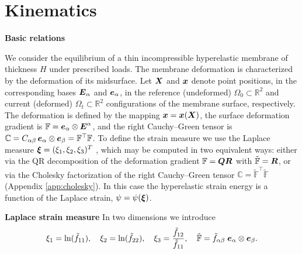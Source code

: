 \section{Kinematics}
\textbf{Basic relations}

We consider the equilibrium of a thin incompressible hyperelastic membrane of thickness $H$ under
prescribed loads.
The membrane deformation is characterized by the deformation of its midsurface.
Let \(\boldsymbol{X}\) and \(\boldsymbol{x}\) denote point positions,
in the corresponding bases \(\boldsymbol{E}_{\alpha}\) and \(\boldsymbol{e}_{\alpha}\),
in the reference (undeformed) \(\Omega_0 \subset \mathbb{R}^2\) and current (deformed) \(\Omega_t \subset \mathbb{R}^2\)
configurations of the membrane surface, respectively.
The deformation is defined by the mapping \(\boldsymbol{x} = \boldsymbol{x}(\boldsymbol{X})\),
the surface deformation gradient is \(\mathbb{F} = \boldsymbol{e}_{\alpha}\otimes\boldsymbol{E}^{\alpha}\),
and the right Cauchy–Green tensor is \(\mathbb C = C_{\alpha\beta} \,\boldsymbol{e}_{\alpha} \otimes \boldsymbol{e}_{\beta} = \mathbb F^{\top} \mathbb F\).
To define the strain measure we use the Laplace measure \(\boldsymbol{\xi} = (\xi_1 , \xi_2 , \xi_3)^T\) \cite{xi2023},
which may be computed in two equivalent ways:
either via the QR decomposition of the deformation gradient \(\mathbb F = \boldsymbol{Q} \boldsymbol{R}\) with \(\tilde{\mathbb F} = \boldsymbol{R}\),
or via the Cholesky factorization of the right Cauchy–Green tensor \(\mathbb C = \tilde{\mathbb F}^{\top}\tilde{\mathbb F}\) (Appendix \ref{app:cholesky}).
In this case the hyperelastic strain energy is a function of the Laplace strain, \(\psi = \psi(\boldsymbol{\xi})\).


\textbf{Laplace strain measure}
In two dimensions we introduce
\begin{equation}
\xi_1 = \ln(\tilde f_{11}),\quad \xi_2 = \ln(\tilde f_{22}),\quad \xi_3 = \frac{\tilde f_{12}}{\tilde f_{11}}, 
\quad \tilde{\mathbb F} = \tilde f_{\alpha\beta} \; \boldsymbol{e}_{\alpha} \otimes \boldsymbol{e}_{\beta}.
\label{eq:laplace_coords}
\end{equation}


